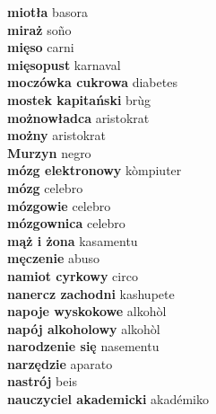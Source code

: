 \textbf{ miotła  } basora \\
\textbf{ miraż  } soño \\
\textbf{ mięso  } carni \\
\textbf{ mięsopust  } karnaval \\
\textbf{ moczówka cukrowa  } diabetes \\
\textbf{ mostek kapitański  } brùg \\
\textbf{ możnowładca  } aristokrat \\
\textbf{ możny  } aristokrat \\
\textbf{ Murzyn  } negro \\
\textbf{ mózg elektronowy  } kòmpiuter \\
\textbf{ mózg  } celebro \\
\textbf{ mózgowie  } celebro \\
\textbf{ mózgownica  } celebro \\
\textbf{ mąż i żona  } kasamentu \\
\textbf{ męczenie  } abuso \\
\textbf{ namiot cyrkowy  } circo \\
\textbf{ nanercz zachodni  } kashupete \\
\textbf{ napoje wyskokowe  } alkohòl \\
\textbf{ napój alkoholowy  } alkohòl \\
\textbf{ narodzenie się  } nasementu \\
\textbf{ narzędzie  } aparato \\
\textbf{ nastrój  } beis \\
\textbf{ nauczyciel akademicki  } akadémiko \\
